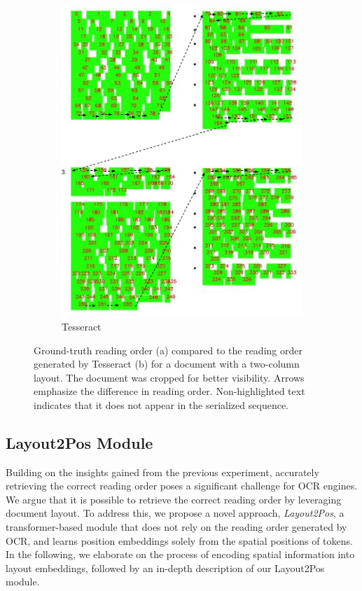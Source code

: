 \begin{figure}
\begin{subfigure}[b]{0.4\textwidth}
        \includegraphics[width=\textwidth]{images/chapter4/tesseract_multicolumn_with_ro.pdf}
        \caption{Tesseract}
      \end{subfigure}
    \caption{Ground-truth reading order (a) compared to the reading order generated by Tesseract (b) for a document with a two-column layout. The document was cropped for better visibility. Arrows emphasize the difference in reading order. Non-highlighted text indicates that it does not appear in the serialized sequence.}
    \label{fig:reading-orders-multicolumn}
\end{figure}


\subsection{Layout2Pos Module}

Building on the insights gained from the previous experiment, accurately retrieving the correct reading order poses a significant challenge for \ac{OCR} engines. We argue that it is possible to retrieve the correct reading order by leveraging document layout. To address this, we propose a novel approach, \textit{Layout2Pos}, a transformer-based module that does not rely on the reading order generated by OCR, and learns position embeddings solely from the spatial positions of tokens. In the following, we elaborate on the process of encoding spatial information into layout embeddings, followed by an in-depth description of our Layout2Pos module.

